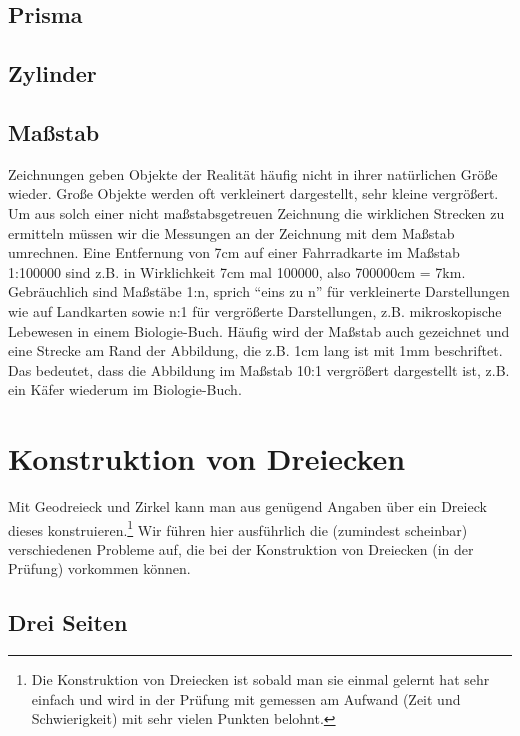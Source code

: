 \documentclass[a4paper]{book}%
\theoremstyle{definition}
\begin{document}
\subsection{Prisma}\label{Prisma}

\subsection{Zylinder}\label{Zylinder}

\subsection{Maßstab}\label{Maßstab}

Zeichnungen geben Objekte der Realität häufig nicht in ihrer natürlichen Größe wieder. Große Objekte werden oft verkleinert dargestellt, sehr kleine vergrößert. Um aus solch einer nicht maßstabsgetreuen Zeichnung die wirklichen Strecken zu ermitteln müssen wir die Messungen an der Zeichnung mit dem Maßstab umrechnen. Eine Entfernung von 7cm auf einer Fahrradkarte im Maßstab 1:100000 sind z.B. in Wirklichkeit 7cm mal 100000, also 700000cm = 7km. Gebräuchlich sind Maßstäbe 1:n, sprich \enquote{eins zu n} für verkleinerte Darstellungen wie auf Landkarten sowie n:1 für vergrößerte Darstellungen, z.B. mikroskopische Lebewesen in einem Biologie-Buch. Häufig wird der Maßstab auch gezeichnet und eine Strecke am Rand der Abbildung, die z.B. 1cm lang ist mit 1mm beschriftet. Das bedeutet, dass die Abbildung im Maßstab 10:1 vergrößert dargestellt ist, z.B. ein Käfer wiederum im Biologie-Buch.


\section{Konstruktion von Dreiecken}

Mit Geodreieck und Zirkel kann man aus genügend Angaben über ein Dreieck dieses konstruieren.\footnote{Die Konstruktion von Dreiecken ist sobald man sie einmal gelernt hat sehr einfach und wird in der Prüfung mit gemessen am Aufwand (Zeit und Schwierigkeit) mit sehr vielen Punkten belohnt.} Wir führen hier ausführlich die (zumindest scheinbar) verschiedenen Probleme auf, die bei der Konstruktion von Dreiecken (in der Prüfung) vorkommen können.

\subsection{Drei Seiten}
\end{document}
